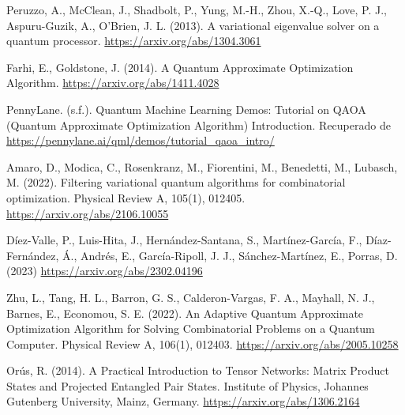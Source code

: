 \begin{thebibliography}{a}

Peruzzo, A., McClean, J., Shadbolt, P., Yung, M.-H., Zhou, X.-Q., Love, P. J., Aspuru-Guzik, A., O’Brien, J. L. (2013). A variational eigenvalue solver on a quantum processor. \url{https://arxiv.org/abs/1304.3061}


Farhi, E., Goldstone, J. (2014). A Quantum Approximate Optimization Algorithm. \url{https://arxiv.org/abs/1411.4028}


PennyLane. (s.f.). Quantum Machine Learning Demos: Tutorial on QAOA (Quantum Approximate Optimization Algorithm) Introduction. Recuperado de \url{https://pennylane.ai/qml/demos/tutorial_qaoa_intro/}


Amaro, D., Modica, C., Rosenkranz, M., Fiorentini, M., Benedetti, M., Lubasch, M. (2022). Filtering variational quantum algorithms for combinatorial optimization. Physical Review A, 105(1), 012405. \url{https://arxiv.org/abs/2106.10055}


Díez-Valle, P., Luis-Hita, J., Hernández-Santana, S., Martínez-García, F., Díaz-Fernández, Á., Andrés, E., García-Ripoll, J. J., Sánchez-Martínez, E., Porras, D. (2023)
\url{https://arxiv.org/abs/2302.04196}


Zhu, L., Tang, H. L., Barron, G. S., Calderon-Vargas, F. A., Mayhall, N. J., Barnes, E., Economou, S. E. (2022). An Adaptive Quantum Approximate Optimization Algorithm for Solving Combinatorial Problems on a Quantum Computer. Physical Review A, 106(1), 012403. \url{https://arxiv.org/abs/2005.10258}


Orús, R. (2014). A Practical Introduction to Tensor Networks: Matrix Product States and Projected Entangled Pair States. Institute of Physics, Johannes Gutenberg University, Mainz, Germany.
\url{https://arxiv.org/abs/1306.2164}

\end{thebibliography}
%
%